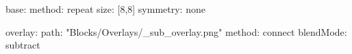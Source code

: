base:
  method: repeat
  size: [8,8]
  symmetry: none

overlay:
  path: "Blocks/Overlays/_sub_overlay.png"
  method: connect
blendMode: subtract
